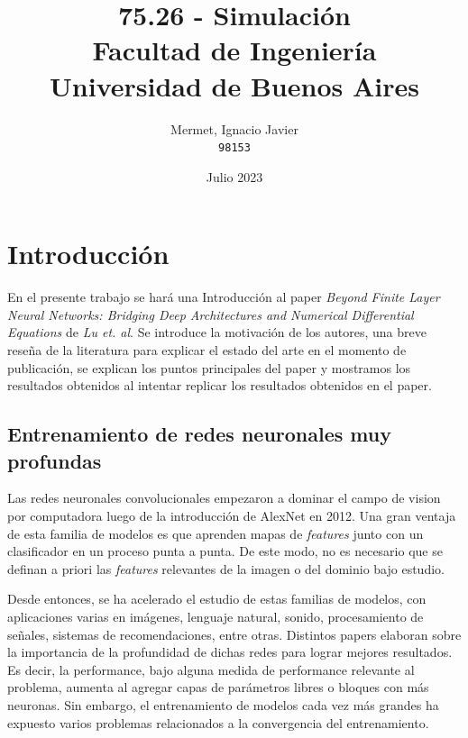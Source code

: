 \documentclass[titlepage,a4paper,oneside]{article}
\begin{document}
\begin{titlepage}
\title{
	75.26 \-- Simulación \\
    \large Facultad de Ingeniería\\
	Universidad de Buenos Aires
}
\author{
	Mermet, Ignacio Javier\\
	\texttt{98153}
}
\date{Julio 2023}

\maketitle

\end{titlepage}

\tableofcontents

\newpage

\section{Introducción}
En el presente trabajo se hará una Introducción al paper \textit{Beyond Finite Layer Neural Networks: Bridging Deep Architectures and Numerical Differential Equations}\cite{lu18d} de \textit{Lu et. al}.  Se introduce la motivación de los autores, una breve reseña de la literatura para explicar el estado del arte en el momento de publicación, se explican los puntos principales del paper y mostramos los resultados obtenidos al intentar replicar los resultados obtenidos en el paper.

\subsection{Entrenamiento de redes neuronales muy profundas}
Las redes neuronales convolucionales empezaron a dominar el campo de vision por computadora luego de la introducción de AlexNet \cite{DBLP:journals/corr/Krizhevsky14} en 2012. Una gran ventaja de esta familia de modelos es que aprenden mapas de \textit{features} junto con un clasificador en un proceso punta a punta. De este modo, no es necesario que se definan a priori las \textit{features} relevantes de la imagen o del dominio bajo estudio.

Desde entonces, se ha acelerado el estudio de estas familias de modelos, con aplicaciones varias en imágenes, lenguaje natural, sonido, procesamiento de señales, sistemas de recomendaciones, entre otras. Distintos papers elaboran sobre la importancia de la profundidad de dichas redes para lograr mejores resultados. Es decir, la performance, bajo alguna medida de performance relevante al problema, aumenta al agregar capas de parámetros libres o bloques con más neuronas. Sin embargo, el entrenamiento de modelos cada vez más grandes ha expuesto varios problemas relacionados a la convergencia del entrenamiento.
\end{document}
